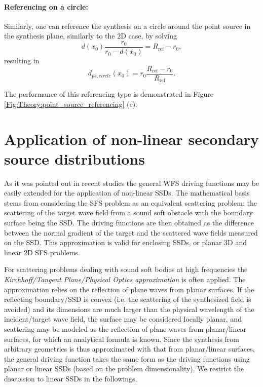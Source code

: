 \documentclass[12pt,a4paper]{article}
\begin{document}
\paragraph{Referencing on a circle:\\}
Similarly, one can reference the synthesis on a circle around the point source in the synthesis plane, similarly to the 2D case, by solving 
\begin{equation}
d(x_0)\frac{r_0}{r_0 - d(x_0)} = R_{\mathrm{ref}} - r_0,
\end{equation}
resulting in
\begin{equation}
d_{ps,circle}(x_0)  = r_0 \frac{R_{\mathrm{ref}} - r_0}{R_{\mathrm{ref}}}.
\end{equation}

The performance of this referencing type is demonstrated in Figure \ref{Fig:Theory:point_source_referencing} (c).

\section{Application of non-linear secondary source distributions}

As it was pointed out in recent studies \cite{Ahrens2012, Fazi2013:Equivalent_scattering, Zotter2013:uniqueness} the general WFS driving functions may be easily extended for the application of non-linear SSDs. The mathematical basis stems from considering the SFS problem as an equivalent scattering problem: the scattering of the target wave field from 
a sound soft obstacle \cite{Fazi2013:Equivalent_scattering} with the boundary surface being the SSD. The driving functions are then obtained as the difference between the normal gradient of the target and the scattered wave fields measured on the SSD.
This approximation is valid for enclosing SSDs, or planar 3D and linear 2D SFS problems.

For scattering problems dealing with sound soft bodies at high frequencies the \emph{Kirchhoff/Tangent Plane/Physical Optics approximation} is often applied.
The approximation relies on the reflection of plane waves from planar surfaces. 
If the reflecting boundary/SSD is convex (i.e. the scattering of the synthesized field is avoided) and its dimensions are much larger than the physical wavelength of the incident/target wave field, the surface may be considered locally planar, and scattering may be modeled as the reflection of plane waves from planar/linear surfaces, for which an analytical formula is known. Since the synthesis from arbitrary geometries is thus approximated with that from planar/linear surfaces, the general driving function takes the same form as the driving functions using planar or linear SSDs (based on the problem dimensionality). We restrict the discussion to linear SSDs in the followings.
\end{document}
